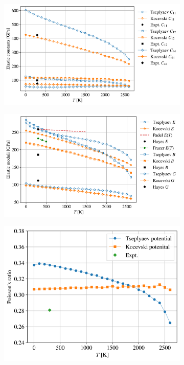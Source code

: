 \documentclass[preprint, 12pt]{elsarticle}
\begin{document}
\begin{figure}[h!]
\centering
\begin{subfigure}{0.49\textwidth}
    \includegraphics[width=\textwidth]{ElasticConstants.png}
    \caption{}
    \label{Fig:ElasConst}
\end{subfigure}
\hfill
\begin{subfigure}{0.49\textwidth}
    \includegraphics[width=\textwidth]{ElasticModuli.png}
    \caption{}
    \label{Fig:ElasMod}
\end{subfigure}
\hfill
\begin{subfigure}{0.45\textwidth}
    \includegraphics[width=\textwidth]{PoissonRatio.png}

\end{subfigure}
\end{figure}
\end{document}
